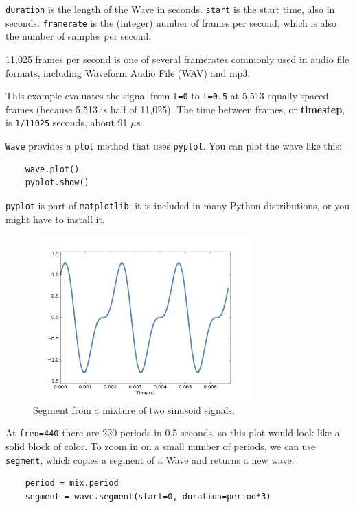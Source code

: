 \documentclass[12pt]{book}
\begin{document}
{\tt duration} is the length of the Wave in seconds.  {\tt start} is
the start time, also in seconds.  {\tt framerate} is the (integer)
number of frames per second, which is also the number of samples
per second.

11,025 frames per second is one of several framerates commonly used in
audio file formats, including Waveform Audio File (WAV) and mp3.

This example evaluates the signal from {\tt t=0} to {\tt t=0.5} at
5,513 equally-spaced frames (because 5,513 is half of 11,025).
The time between frames, or {\bf timestep}, is {\tt 1/11025} seconds, about
91 $\mu$s.

{\tt Wave} provides a {\tt plot} method that uses {\tt pyplot}.
You can plot the wave like this:

\begin{verbatim}
    wave.plot()
    pyplot.show()
\end{verbatim}

{\tt pyplot} is part of {\tt matplotlib}; it is included in many
Python distributions, or you might have to install it.

\begin{figure}
\centerline{\includegraphics[height=2.5in]{figs/sounds4.pdf}}
\caption{Segment from a mixture of two sinusoid signals.}
\label{fig.sounds4}
\end{figure}

At {\tt freq=440} there are 220 periods in 0.5 seconds, so this plot
would look like a solid block of color.  To zoom in on a small number
of periods, we can use {\tt segment}, which copies a segment of a Wave
and returns a new wave:

\begin{verbatim}
    period = mix.period
    segment = wave.segment(start=0, duration=period*3)
\end{verbatim}
\end{document}
